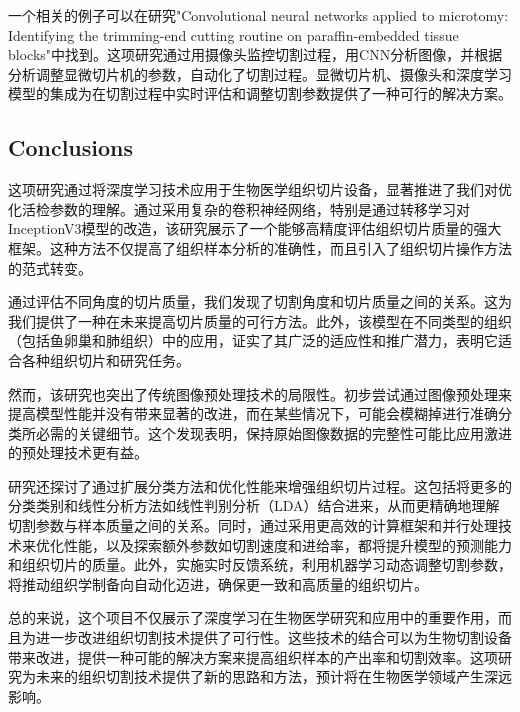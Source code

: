 一个相关的例子可以在研究"Convolutional neural networks applied to microtomy: Identifying the trimming-end cutting routine on paraffin-embedded tissue blocks"\cite{6.4}中找到。这项研究通过用摄像头监控切割过程，用CNN分析图像，并根据分析调整显微切片机的参数，自动化了切割过程。显微切片机、摄像头和深度学习模型的集成为在切割过程中实时评估和调整切割参数提供了一种可行的解决方案。

\subsection{Conclusions}

这项研究通过将深度学习技术应用于生物医学组织切片设备，显著推进了我们对优化活检参数的理解。通过采用复杂的卷积神经网络，特别是通过转移学习对InceptionV3模型的改造，该研究展示了一个能够高精度评估组织切片质量的强大框架。这种方法不仅提高了组织样本分析的准确性，而且引入了组织切片操作方法的范式转变。

通过评估不同角度的切片质量，我们发现了切割角度和切片质量之间的关系。这为我们提供了一种在未来提高切片质量的可行方法。此外，该模型在不同类型的组织（包括鱼卵巢和肺组织）中的应用，证实了其广泛的适应性和推广潜力，表明它适合各种组织切片和研究任务。

然而，该研究也突出了传统图像预处理技术的局限性。初步尝试通过图像预处理来提高模型性能并没有带来显著的改进，而在某些情况下，可能会模糊掉进行准确分类所必需的关键细节。这个发现表明，保持原始图像数据的完整性可能比应用激进的预处理技术更有益。

研究还探讨了通过扩展分类方法和优化性能来增强组织切片过程。这包括将更多的分类类别和线性分析方法如线性判别分析（LDA）结合进来，从而更精确地理解切割参数与样本质量之间的关系。同时，通过采用更高效的计算框架和并行处理技术来优化性能，以及探索额外参数如切割速度和进给率，都将提升模型的预测能力和组织切片的质量。此外，实施实时反馈系统，利用机器学习动态调整切割参数，将推动组织学制备向自动化迈进，确保更一致和高质量的组织切片。

总的来说，这个项目不仅展示了深度学习在生物医学研究和应用中的重要作用，而且为进一步改进组织切割技术提供了可行性。这些技术的结合可以为生物切割设备带来改进，提供一种可能的解决方案来提高组织样本的产出率和切割效率。这项研究为未来的组织切割技术提供了新的思路和方法，预计将在生物医学领域产生深远影响。






\FloatBarrier %